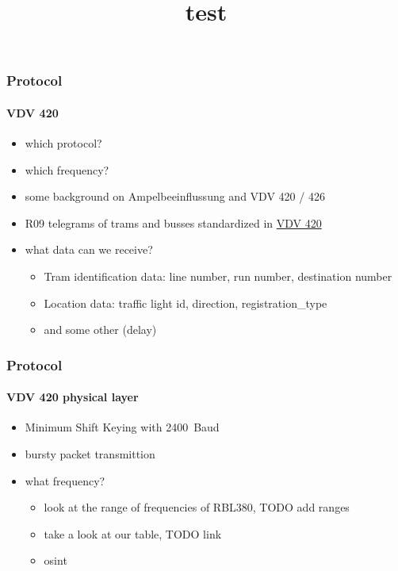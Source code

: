 \documentclass[aspectratio=169]{beamer}
\begin{document}

\begin{frame}
\frametitle{Protocol}
\framesubtitle{VDV 420}
	\begin{itemize}
		\item which protocol?
		\item which frequency?
		\item some background on Ampelbeeinflussung and VDV 420 / 426
		\item R09 telegrams of trams and busses standardized in \href{https://knowhow.vdv.de/documents/420/}{VDV 420}
	\end{itemize}
\end{frame}


\begin{frame}
\title{test}
\begin{itemize}
	\item what data can we receive?
	\begin{itemize}
		\item Tram identification data: line number, run number, destination number
		\item Location data: traffic light id, direction, registration\_type
		\item and some other (delay)
	\end{itemize}
\end{itemize}
\end{frame}


\begin{frame}
\frametitle{Protocol}
\framesubtitle{VDV 420 physical layer}
\begin{itemize}
	\item Minimum Shift Keying with \SI{2400}{Baud}
	\item bursty packet transmittion
		\item what frequency?
		\begin{itemize}
			\item look at the range of frequencies of RBL380, TODO add ranges
			\item take a look at our table, TODO link
			\item osint
		\end{itemize}
\end{itemize}
\end{frame}
\end{document}
